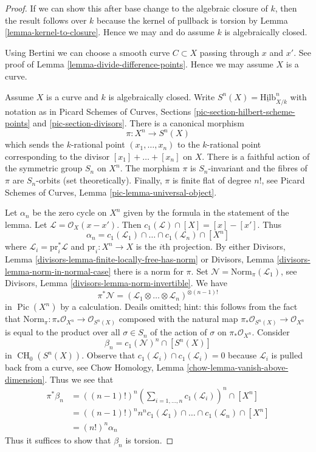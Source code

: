 \documentclass{stacks-project}
\theoremstyle{plain}
\theoremstyle{definition}
\theoremstyle{remark}
\numberwithin{equation}{subsection}
\def\CH{\mathop{\mathrm{CH}}\nolimits}
\def\Hilbfunctor{\mathrm{Hilb}}
\def\Pic{\mathop{\mathrm{Pic}}\nolimits}
\begin{document}
\begin{proof}
If we can show this after base change to the algebraic closure of $k$,
then the result follows over $k$ because the kernel of pullback
is torsion by Lemma \ref{lemma-kernel-to-closure}.
Hence we may and do assume $k$ is algebraically closed.

\medskip\noindent
Using Bertini we can choose a smooth curve $C \subset X$ passing through
$x$ and $x'$. See proof of Lemma \ref{lemma-divide-difference-points}.
Hence we may assume $X$ is a curve.

\medskip\noindent
Assume $X$ is a curve and $k$ is algebraically closed.
Write $S^n(X) = \underline{\Hilbfunctor}^n_{X/k}$ with notation as in
Picard Schemes of Curves, Sections \ref{pic-section-hilbert-scheme-points}
and \ref{pic-section-divisors}. There is a canonical morphism
$$
\pi : X^n \longrightarrow S^n(X)
$$
which sends the $k$-rational point $(x_1, \ldots, x_n)$ to the $k$-rational
point corresponding to the divisor $[x_1] + \ldots + [x_n]$ on $X$.
There is a faithful action of the symmetric group $S_n$ on $X^n$.
The morphism $\pi$ is $S_n$-invariant and the fibres of $\pi$ are
$S_n$-orbits (set theoretically). Finally, $\pi$ is finite flat of
degree $n!$, see Picard Schemes of Curves, Lemma
\ref{pic-lemma-universal-object}.

\medskip\noindent
Let $\alpha_n$ be the zero cycle on $X^n$ given by the formula in the
statement of the lemma. Let $\mathcal{L} = \mathcal{O}_X(x - x')$. Then
$c_1(\mathcal{L}) \cap [X] = [x] - [x']$. Thus
$$
\alpha_n = c_1(\mathcal{L}_1) \cap \ldots \cap c_1(\mathcal{L}_n) \cap [X^n]
$$
where $\mathcal{L}_i = \text{pr}_i^*\mathcal{L}$ and $\text{pr}_i : X^n \to X$
is the $i$th projection. By either
Divisors, Lemma \ref{divisors-lemma-finite-locally-free-has-norm} or
Divisors, Lemma \ref{divisors-lemma-norm-in-normal-case}
there is a norm for $\pi$. Set
$\mathcal{N} = \text{Norm}_\pi(\mathcal{L}_1)$, 
see Divisors, Lemma \ref{divisors-lemma-norm-invertible}. We have
$$
\pi^*\mathcal{N} =
(\mathcal{L}_1 \otimes \ldots \otimes \mathcal{L}_n)^{\otimes (n - 1)!}
$$
in $\Pic(X^n)$ by a calculation. Deails omitted; hint: this follows from
the fact that
$\text{Norm}_\pi : \pi_*\mathcal{O}_{X^n} \to \mathcal{O}_{S^n(X)}$
composed with the natural map $\pi_*\mathcal{O}_{S^n(X)} \to \mathcal{O}_{X^n}$
is equal to the product over all $\sigma \in S_n$ of the action of
$\sigma$ on $\pi_*\mathcal{O}_{X^n}$. Consider
$$
\beta_n = c_1(\mathcal{N})^n \cap [S^n(X)]
$$
in $\CH_0(S^n(X))$. Observe that
$c_1(\mathcal{L}_i) \cap c_1(\mathcal{L}_i) = 0$
because $\mathcal{L}_i$ is pulled back from a curve, see
Chow Homology, Lemma \ref{chow-lemma-vanish-above-dimension}. Thus we see that
\begin{align*}
\pi^*\beta_n
& =
((n - 1)!)^n
(\sum\nolimits_{i = 1, \ldots, n} c_1(\mathcal{L}_i))^n \cap [X^n] \\
& =
((n - 1)!)^n n^n 
c_1(\mathcal{L}_1) \cap \ldots \cap c_1(\mathcal{L}_n) \cap [X^n] \\
& =
(n!)^n \alpha_n
\end{align*}
Thus it suffices to show that $\beta_n$ is torsion.


\end{proof}
\end{document}

